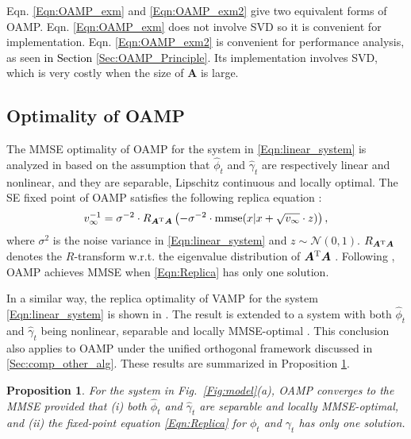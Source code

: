 \documentclass[journal]{IEEEtran}
\newcommand{\BE}{\begin{equation}}
\newcommand{\EE}{\end{equation}}
\renewcommand{\bf}{\bm}
\renewcommand{\cal}{\mathcal}
\newtheorem{proposition}[theorem]{Proposition}
\newcommand{\LL}[1]{\textcolor{black}{#1}}
\begin{document}
Eqn. \eqref{Eqn:OAMP_exm} and  \eqref{Eqn:OAMP_exm2} give two equivalent forms of OAMP. Eqn. \eqref{Eqn:OAMP_exm} does not involve SVD so it is convenient for implementation.  Eqn. \eqref{Eqn:OAMP_exm2} is convenient for performance analysis, as seen \LL{in Section \ref{Sec:OAMP_Principle}}. Its implementation involves SVD, which is very costly when the size of $\bf{A}$ is large. 

\subsection{Optimality of OAMP}\label{Sec:Opt_OAMP}
The MMSE optimality of OAMP for the system in \eqref{Eqn:linear_system} is analyzed in \cite{Ma2016} based on the assumption that $\hat{\phi}_t$ and $\hat{\gamma}_t$ are respectively linear and nonlinear, and they are separable, Lipschitz continuous and locally optimal. The SE fixed point of   OAMP satisfies the following replica equation \cite{Replica_Guo2005}:
\BE \label{Eqn:Replica}
  {v_{\infty}^{-1}} =  {\sigma^{-2}} \cdot R_{\bf{A}^{\rm T}\bf{A}} \left( -  {\sigma^{-2}} \cdot \mathrm{mmse}(x|x+\sqrt{v_{\infty}}\cdot z) \right),
\EE
where $\sigma^2$ is the noise variance in \eqref{Eqn:linear_system} and $z \sim \cal{N}(0,1)$. $R_{\bf{A}^{\rm T}\bf{A}}$ denotes the $R$-transform w.r.t. the eigenvalue distribution of $\bf{A}^{\rm T}\bf{A}$ \cite{Tulino2004}. Following \cite{Replica_Guo2005}, OAMP achieves MMSE when \eqref{Eqn:Replica} has only one solution.

In a similar way, the replica optimality of VAMP for the system \eqref{Eqn:linear_system} is shown in \cite{Rangan2016}. The result is extended to a system with both $\hat{\phi}_t$ and $\hat{\gamma}_t$ being nonlinear, separable and locally MMSE-optimal \cite{Fletcher2016,Cakmak2018}. This conclusion also applies to OAMP under the unified orthogonal framework discussed in \ref{Sec:comp_other_alg}. These results are summarized in Proposition \ref{OptOAMP}.

\begin{proposition} \label{OptOAMP}
For the system in Fig.~\ref{Fig:model}(a), OAMP converges to the MMSE provided that (i) both $\hat{\phi}_t$ and $\hat{\gamma}_t$ are separable and locally MMSE-optimal, and (ii) the fixed-point equation \eqref{Eqn:Replica} for $\phi_t$ and $\gamma_t$ has only one solution. 
\end{proposition}

 
\end{document}
